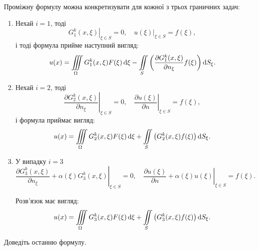 Проміжну формулу можна конкретизувати для кожної з трьох граничних задач:
\begin{enumerate}
	\item Нехай $i = 1$, тоді
	\begin{equation}
		\left. G_1^k(x, \xi) \right|_{\xi \in S} = 0, \quad \left. u(\xi) \right|_{\xi \in S} = f(\xi),
	\end{equation}
	і тоді формула прийме наступний вигляд:
	\begin{equation}
		\label{eq:4.3.46}
		u(x) = \displaystyle\iiint\limits_\Omega G_1^k(x, \xi) F(\xi) \mathop{}\!\mathrm{d} \xi - \displaystyle\iint\limits_S \left( \frac{\partial G_1^k(x, \xi)}{\partial n_\xi} f(\xi) \right) \mathop{}\!\mathrm{d} S_\xi.
	\end{equation}

	\item Нехай $i = 2$, тоді 
	\begin{equation}
		\left. \frac{\partial G_2^k(x, \xi)}{\partial n_\xi} \right|_{\xi \in S} = 0, \quad \left. \frac{\partial u(\xi)}{\partial n} \right|_{\xi \in S} = f(\xi),
	\end{equation}
	і формула приймає вигляд:
	\begin{equation}
		\label{eq:4.3.47}
		u(x) = \displaystyle\iiint\limits_\Omega G_2^k(x, \xi) F(\xi) \mathop{}\!\mathrm{d} \xi + \displaystyle\iint\limits_S \left( G_2^k(x, \xi) f(\xi) \right) \mathop{}\!\mathrm{d} S_\xi.
	\end{equation}

	\item У випадку $i = 3$
	\begin{equation}
		\left. \frac{\partial G_3^k(x, \xi)}{\partial n_\xi} + \alpha(\xi) G_3^k(x, \xi) \right|_{\xi \in S} = 0, \quad \left. \frac{\partial u(\xi)}{\partial n} + \alpha(\xi) u(\xi) \right|_{\xi \in S} = f(\xi).
	\end{equation}

	Розв'язок має вигляд:
	\begin{equation}
		u(x) = \displaystyle\iiint\limits_\Omega G_3^k(x, \xi) F(\xi) \mathop{}\!\mathrm{d} \xi + \displaystyle\iint\limits_S \left( G_3^k(x, \xi) f(\xi) \right) \mathop{}\!\mathrm{d} S_\xi.
	\end{equation}
\end{enumerate}

\begin{exercise}
	Доведіть останню формулу.
\end{exercise}


